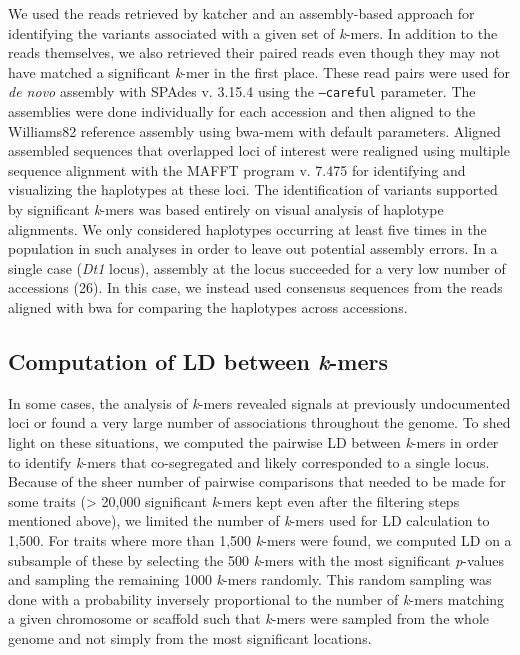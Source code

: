 \documentclass{article}
\begin{document}
We used the reads retrieved by katcher and an assembly-based approach for
identifying the variants associated with a given set of \emph{k}-mers. In
addition to the reads themselves, we also retrieved their paired reads even
though they may not have matched a significant \emph{k}-mer in the first place.
These read pairs were used for \emph{de novo} assembly with SPAdes v. 3.15.4
\citep{spades} using the \texttt{--careful} parameter. The assemblies were done
individually for each accession and then aligned to the Williams82 reference
assembly using bwa-mem with default parameters.  Aligned assembled sequences
that overlapped loci of interest were realigned using multiple sequence
alignment with the MAFFT program v. 7.475 \citep{katoh2002} for identifying and
visualizing the haplotypes at these loci. The identification of variants
supported by significant \textit{k}-mers was based entirely on visual analysis
of haplotype alignments. We only considered haplotypes occurring at least five
times in the population in such analyses in order to leave out potential
assembly errors. In a single case (\emph{Dt1} locus), assembly at the locus
succeeded for a very low number of accessions (26). In this case, we instead used
consensus sequences from the reads aligned with bwa for comparing the
haplotypes across accessions. 

\subsection*{Computation of LD between \emph{k}-mers}

In some cases, the analysis of \emph{k}-mers revealed signals at previously
undocumented loci or found a very large number of associations throughout the
genome. To shed light on these situations, we computed the pairwise LD between
\emph{k}-mers in order to identify \emph{k}-mers that co-segregated and
likely corresponded to a single locus. Because of the sheer number of pairwise
comparisons that needed to be made for some traits (> 20,000 significant
\emph{k}-mers kept even after the filtering steps mentioned above), we limited
the number of \emph{k}-mers used for LD calculation to 1,500. For traits where
more than 1,500 \emph{k}-mers were found, we computed LD on a subsample of
these by selecting the 500 \emph{k}-mers with the most significant
\emph{p}-values and sampling the remaining 1000 \emph{k}-mers randomly. This
random sampling was done with a probability inversely proportional to the
number of \emph{k}-mers matching a given chromosome or scaffold such that
\emph{k}-mers were sampled from the whole genome and not simply from the most
significant locations.
\end{document}
